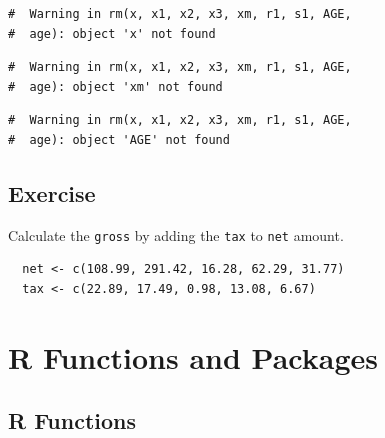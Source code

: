 \documentclass[letterpaperpaper,9pt,twocolumn,twoside,printwatermark=false]{pinp}
\begin{document}
\begin{ShadedResult}
\begin{verbatim}
#  Warning in rm(x, x1, x2, x3, xm, r1, s1, AGE,
#  age): object 'x' not found
\end{verbatim}
\end{ShadedResult}
\begin{ShadedResult}
\begin{verbatim}
#  Warning in rm(x, x1, x2, x3, xm, r1, s1, AGE,
#  age): object 'xm' not found
\end{verbatim}
\end{ShadedResult}
\begin{ShadedResult}
\begin{verbatim}
#  Warning in rm(x, x1, x2, x3, xm, r1, s1, AGE,
#  age): object 'AGE' not found
\end{verbatim}
\end{ShadedResult}

\begin{Shaded}
\begin{Highlighting}[]
\NormalTok{()}
\end{Highlighting}
\end{Shaded}

\hypertarget{exercise-2}{%
\subsection{Exercise}\label{exercise-2}}

Calculate the \texttt{gross} by adding the \texttt{tax} to \texttt{net}
amount.

\begin{verbatim}
  net <- c(108.99, 291.42, 16.28, 62.29, 31.77)
  tax <- c(22.89, 17.49, 0.98, 13.08, 6.67)
\end{verbatim}

\hypertarget{r-functions-and-packages}{%
\section{R Functions and Packages}\label{r-functions-and-packages}}

\hypertarget{r-functions}{%
\subsection{R Functions}\label{r-functions}}
\end{document}
